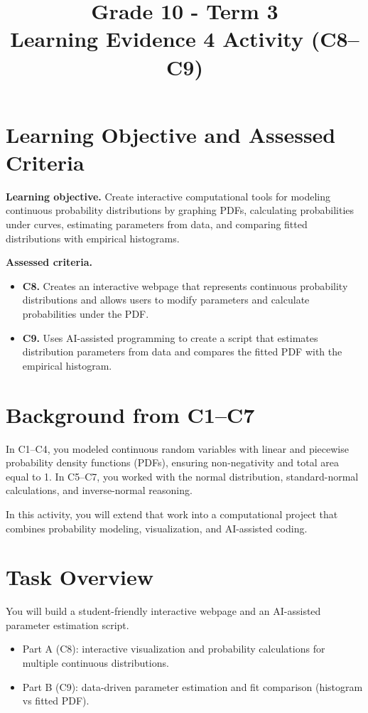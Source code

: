 \makeatletter
{}
\makeatother



\title{Grade 10 - Term 3 \\ Learning Evidence 4 Activity (C8--C9)}
\author{}
\date{}


	\maketitle
	
	\section*{Learning Objective and Assessed Criteria}
	\textbf{Learning objective.} Create interactive computational tools for modeling continuous probability distributions by graphing PDFs, calculating probabilities under curves, estimating parameters from data, and comparing fitted distributions with empirical histograms.
	
	\vspace{0.2cm}
	\textbf{Assessed criteria.}
	\begin{itemize}
		\item \textbf{C8.} Creates an interactive webpage that represents continuous probability distributions and allows users to modify parameters and calculate probabilities under the PDF.
		\item \textbf{C9.} Uses AI-assisted programming to create a script that estimates distribution parameters from data and compares the fitted PDF with the empirical histogram.
	\end{itemize}

	\section{Background from C1--C7}
	In C1--C4, you modeled continuous random variables with linear and piecewise probability density functions (PDFs), ensuring non-negativity and total area equal to 1. In C5--C7, you worked with the normal distribution, standard-normal calculations, and inverse-normal reasoning.
	
	In this activity, you will extend that work into a computational project that combines probability modeling, visualization, and AI-assisted coding.

	\section{Task Overview}
	You will build a student-friendly interactive webpage and an AI-assisted parameter estimation script.
	\begin{itemize}
		\item Part A (C8): interactive visualization and probability calculations for multiple continuous distributions.
		\item Part B (C9): data-driven parameter estimation and fit comparison (histogram vs fitted PDF).
	\end{itemize}
	
